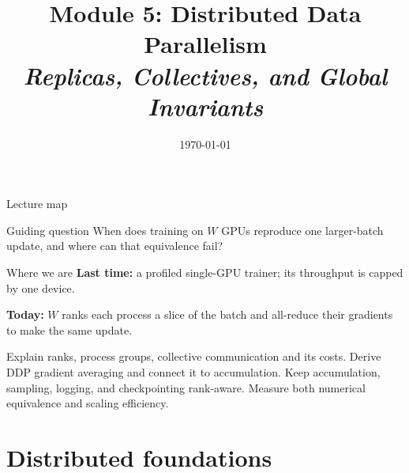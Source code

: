 \documentclass[handout]{beamer}
\title[TASLLM -- Module 5]{Module 5: Distributed Data Parallelism\\[4pt]
\normalsize\itshape Replicas, Collectives, and Global Invariants}
\date{\today}
\begin{document}
\makelecturetitle
\begin{frame}{Lecture map}
  \tableofcontents
  \vfill
  \begin{block}{Guiding question}
    When does training on $W$ GPUs reproduce one larger-batch update, and where can that equivalence fail?
  \end{block}
\end{frame}

\begin{frame}{Where we are}
  \vspace{10pt}
  \textbf{\textcolor{accentdark}{Last time:}} a profiled single-GPU trainer; its throughput is capped by one device.\par
  \vspace{10pt}
  \textbf{\textcolor{signaldark}{Today:}} $W$ ranks each process a slice of the batch and all-reduce their gradients to make the same update.
\end{frame}
\learninggoals
{Explain ranks, process groups, collective communication and its costs.}
{Derive DDP gradient averaging and connect it to accumulation.}
{Keep accumulation, sampling, logging, and checkpointing rank-aware.}
{Measure both numerical equivalence and scaling efficiency.}

\section{Distributed foundations}
\end{document}
